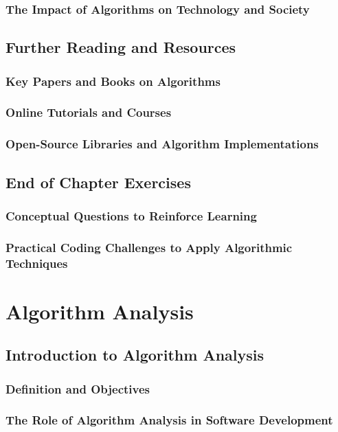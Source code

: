 \documentclass[12pt]{book} %
\begin{document}
\subsection{The Impact of Algorithms on Technology and Society}

\section{Further Reading and Resources}
\subsection{Key Papers and Books on Algorithms}
\subsection{Online Tutorials and Courses}
\subsection{Open-Source Libraries and Algorithm Implementations}

\section{End of Chapter Exercises}
\subsection{Conceptual Questions to Reinforce Learning}
\subsection{Practical Coding Challenges to Apply Algorithmic Techniques}


\chapter{Algorithm Analysis}

\section{Introduction to Algorithm Analysis}
\subsection{Definition and Objectives}
\subsection{The Role of Algorithm Analysis in Software Development}
\end{document}
